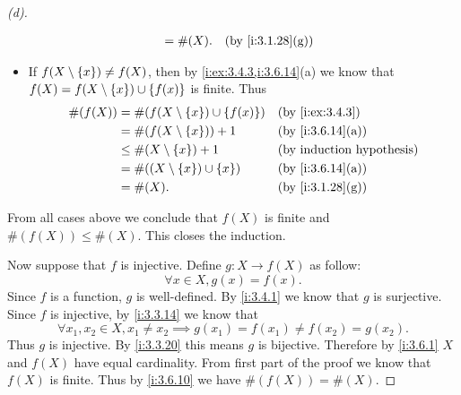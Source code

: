\begin{proof}[(d)]
\begin{itemize}
\begin{align*}
                     & = \#(X).                                 &  & \by{i:3.1.28}[g]
          \end{align*}
    \item If \(f(X \setminus \left\lbrace x\right\rbrace) \neq f(X)\), then by \cref{i:ex:3.4.3,i:3.6.14}(a) we know that \(f(X) = f(X \setminus \left\lbrace x\right\rbrace) \cup \left\lbrace f(x)\right\rbrace\) is finite.
          Thus
          \begin{align*}
            \#(f(X)) & = \#(f(X \setminus \set{x}) \cup \set{f(x)}) &  & \by{i:ex:3.4.3}  \\
                     & = \#(f(X \setminus \set{x})) + 1             &  & \by{i:3.6.14}[a] \\
                     & \leq \#(X \setminus \set{x}) + 1             &  & \byIH            \\
                     & = \#((X \setminus \set{x}) \cup \set{x})     &  & \by{i:3.6.14}[a] \\
                     & = \#(X).                                     &  & \by{i:3.1.28}[g]
          \end{align*}
  \end{itemize}
  From all cases above we conclude that \(f(X)\) is finite and \(\#(f(X)) \leq \#(X)\).
  This closes the induction.

  Now suppose that \(f\) is injective.
  Define \(g : X \to f(X)\) as follow:
  \[
    \forall x \in X, g(x) = f(x).
  \]
  Since \(f\) is a function, \(g\) is well-defined.
  By \cref{i:3.4.1} we know that \(g\) is surjective.
  Since \(f\) is injective, by \cref{i:3.3.14} we know that
  \[
    \forall x_1, x_2 \in X, x_1 \neq x_2 \implies g(x_1) = f(x_1) \neq f(x_2) = g(x_2).
  \]
  Thus \(g\) is injective.
  By \cref{i:3.3.20} this means \(g\) is bijective.
  Therefore by \cref{i:3.6.1} \(X\) and \(f(X)\) have equal cardinality.
  From first part of the proof we know that \(f(X)\) is finite.
  Thus by \cref{i:3.6.10} we have \(\#(f(X)) = \#(X)\).
\end{proof}

